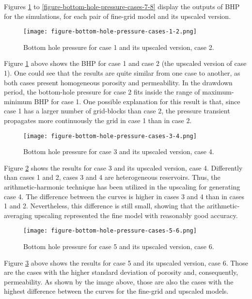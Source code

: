 Figures \ref{figure-bottom-hole-pressure-cases-1-2} to \ref{figure-bottom-hole-pressure-cases-7-8} display the outputs of BHP for the simulations, for each pair of fine-grid model and its upscaled version.
%
\begin{figure}[H]
	\centering
	\texttt{[image: figure-bottom-hole-pressure-cases-1-2.png]}
	\caption{Bottom hole pressure for case 1 and its upscaled version, case 2.}
	\label{figure-bottom-hole-pressure-cases-1-2}
\end{figure}
\noindent
%
Figure \ref{figure-bottom-hole-pressure-cases-1-2} above shows the BHP for case 1 and case 2 (the upscaled version of case 1).
%
One could see that the results are quite similar from one case to another, as both cases present homogeneous porosity and permeability.
%
In the drawdown period, the bottom-hole pressure for case 2 fits inside the range of maximum-minimum BHP for case 1.
%
One possible explanation for this result is that, since case 1 has a larger number of grid-blocks than case 2, the pressure transient propagates more continuously the grid in case 1 than in case 2.
%
\begin{figure}[H]
	\centering
	\texttt{[image: figure-bottom-hole-pressure-cases-3-4.png]}
	\caption{Bottom hole pressure for case 3 and its upscaled version, case 4.}
	\label{figure-bottom-hole-pressure-cases-3-4}
\end{figure}
\noindent
%
Figure \ref{figure-bottom-hole-pressure-cases-3-4} shows the results for case 3 and its upscaled version, case 4.
%
Differently than cases 1 and 2, cases 3 and 4 are heterogeneous reservoirs.
%
Thus, the arithmetic-harmonic technique has been utilized in the upscaling for generating case 4.
%
The difference between the curves is higher in cases 3 and 4 than in cases 1 and 2.
%
Nevertheless, this difference is still small, showing that the arithmetic-averaging upscaling represented the fine model with reasonably good accuracy.
%
\begin{figure}[H]
	\centering
	\texttt{[image: figure-bottom-hole-pressure-cases-5-6.png]}
	\caption{Bottom hole pressure for case 5 and its upscaled version, case 6.}
	\label{figure-bottom-hole-pressure-cases-5-6}
\end{figure}
\noindent
%
Figure \ref{figure-bottom-hole-pressure-cases-5-6} above shows the results for case 5 and its upscaled version, case 6.
%
Those are the cases with the higher standard deviation of porosity and, consequently, permeability.
%
As shown by the image above, those are also the cases with the highest difference between the curves for the fine-grid and upscaled models.
